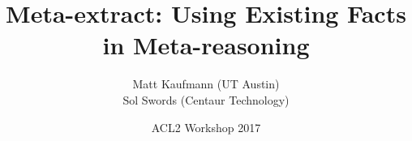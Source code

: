 
\newcommand\mydotdot{{\color{orange} ...}}





\begin{frame}
\title{Meta-extract: Using Existing Facts in Meta-reasoning}
\author{
        Matt Kaufmann (UT Austin) \\
        Sol Swords (Centaur Technology)
}
\date{
        \vspace{1cm}
        ACL2 Workshop 2017
}
\titlepage
\end{frame}
